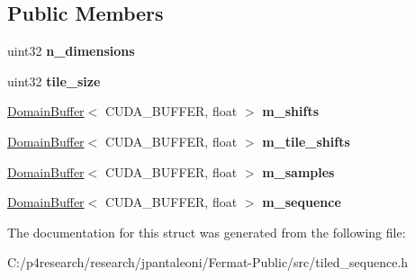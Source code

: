 \subsection*{Public Members}
\begin{DoxyCompactItemize}
\item 
\mbox{\label{struct_tiled_sequence_acc4eff780fa87d92e5f7d9d76162fbc7}} 
uint32 {\bfseries n\+\_\+dimensions}
\item 
\mbox{\label{struct_tiled_sequence_a2aa4489d03e4ee0e57e8dbcbc55fdeb3}} 
uint32 {\bfseries tile\+\_\+size}
\item 
\mbox{\label{struct_tiled_sequence_a76da4c191405ced146640d5c3845f14a}} 
\hyperlink{class_domain_buffer}{Domain\+Buffer}$<$ C\+U\+D\+A\+\_\+\+B\+U\+F\+F\+ER, float $>$ {\bfseries m\+\_\+shifts}
\item 
\mbox{\label{struct_tiled_sequence_a8e42e7644c7fbd0c1405f2e3423bb9af}} 
\hyperlink{class_domain_buffer}{Domain\+Buffer}$<$ C\+U\+D\+A\+\_\+\+B\+U\+F\+F\+ER, float $>$ {\bfseries m\+\_\+tile\+\_\+shifts}
\item 
\mbox{\label{struct_tiled_sequence_abc0f33464eb2635f82f75795161016d1}} 
\hyperlink{class_domain_buffer}{Domain\+Buffer}$<$ C\+U\+D\+A\+\_\+\+B\+U\+F\+F\+ER, float $>$ {\bfseries m\+\_\+samples}
\item 
\mbox{\label{struct_tiled_sequence_af9c60d31fcf96d55746961c588efa6b5}} 
\hyperlink{class_domain_buffer}{Domain\+Buffer}$<$ C\+U\+D\+A\+\_\+\+B\+U\+F\+F\+ER, float $>$ {\bfseries m\+\_\+sequence}
\end{DoxyCompactItemize}


The documentation for this struct was generated from the following file\+:\begin{DoxyCompactItemize}
\item 
C\+:/p4research/research/jpantaleoni/\+Fermat-\/\+Public/src/tiled\+\_\+sequence.\+h\end{DoxyCompactItemize}
